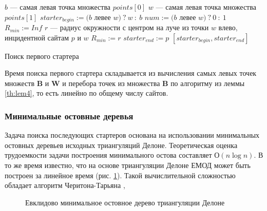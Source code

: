 \documentclass[12pt]{article}
\begin{document}
\begin{algorithm}[htb!]
\begin{algorithmic}[1]
	\State $b$ --- самая левая точка множества $points[0]$
	\State $w$ --- самая левая точка множества $points[1]$
	\State $starter_{begin} := (b$ левее $w)~?~w~:~b$
	\State $num := (b$ левее $w)~?~0~:~1$
	\State $R_{min} := Inf$
		\State $r$ --- радиус окружности с центром на луче из точки $w$ влево,
		инцидентной сайтам $p$ и $w$
			\State $R_{min} := r$
			\State $starter_{end} := p$
		\EndIf
	\EndFor
	\State \Return $[starter_{begin}, starter_{end}]$
\EndProcedure
\end{algorithmic}
\caption{Поиск первого стартера}
\label{alg:findFirstStarter}
\end{algorithm}

Время поиска первого стартера складывается из вычисления самых левых точек множеств $\textbf{B}$ и $\textbf{W}$ и
перебора точек из множества $\textbf{B}$ по алгоритму из леммы \ref{th:lem4},
то есть линейно по общему числу сайтов.

\subsubsection{Минимальные остовные деревья}
Задача поиска последующих стартеров основана на использовании минимальных остовных деревьев исходных триангуляций Делоне.
Теоретическая оценка трудоемкости задачи построения минимального остова составляет $О(n\log n)$.
В то же время известно, что на основе триангуляции Делоне ЕМОД может быть построен за линейное время (рис. \ref{pic:mst}).
Такой вычислительной сложностью обладает алгоритм Черитона-Тарьяна \cite[стр. 278-280]{Preparata},

\begin{figure}[htb!]
	\caption{Евклидово минимальное остовное дерево триангуляции Делоне}
	\label{pic:mst}
\end{figure}
\end{document}
